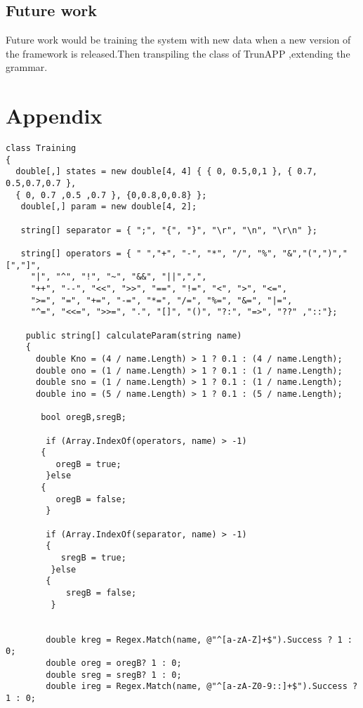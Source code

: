 \documentclass[23pt]{article}
\begin{document}
\subsection{Future work}
{\Large Future work would be training the system with new data when a new version of the framework is released.Then transpiling the class of TrunAPP ,extending the grammar.   \\  \par}

\newpage

\newpage

\section{Appendix}


\begin{lstlisting}[label=some-code,caption= Code for training the system]
class Training
{
  double[,] states = new double[4, 4] { { 0, 0.5,0,1 }, { 0.7, 0.5,0.7,0.7 },
  { 0, 0.7 ,0.5 ,0.7 }, {0,0.8,0,0.8} };
   double[,] param = new double[4, 2];

   string[] separator = { ";", "{", "}", "\r", "\n", "\r\n" };

   string[] operators = { " ","+", "-", "*", "/", "%", "&","(",")","[","]",
     "|", "^", "!", "~", "&&", "||",",",
     "++", "--", "<<", ">>", "==", "!=", "<", ">", "<=",
     ">=", "=", "+=", "-=", "*=", "/=", "%=", "&=", "|=",
     "^=", "<<=", ">>=", ".", "[]", "()", "?:", "=>", "??" ,"::"};

    public string[] calculateParam(string name)
    {
      double Kno = (4 / name.Length) > 1 ? 0.1 : (4 / name.Length);
      double ono = (1 / name.Length) > 1 ? 0.1 : (1 / name.Length);
      double sno = (1 / name.Length) > 1 ? 0.1 : (1 / name.Length);
      double ino = (5 / name.Length) > 1 ? 0.1 : (5 / name.Length);

       bool oregB,sregB;

        if (Array.IndexOf(operators, name) > -1) 
       {
          oregB = true; 
        }else
       {
          oregB = false;
        }

        if (Array.IndexOf(separator, name) > -1) 
        {
           sregB = true; 
         }else
        {
            sregB = false;
         }


        double kreg = Regex.Match(name, @"^[a-zA-Z]+$").Success ? 1 : 0;
        double oreg = oregB? 1 : 0;
        double sreg = sregB? 1 : 0; 
        double ireg = Regex.Match(name, @"^[a-zA-Z0-9::]+$").Success ? 1 : 0;


\end{lstlisting}
\end{document}
